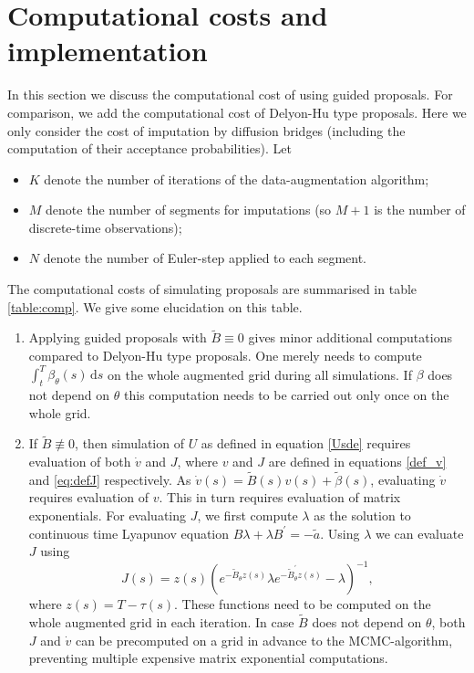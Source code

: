 \documentclass[preprint]{imsart}
\renewcommand{\th}{\theta}
\newcommand{\la}{\lambda}
\renewcommand{\tilde}{\widetilde}
\theoremstyle{definition}
\newcommand{\dd}{{\,\mathrm d}}
\newcommand{\T}{{\prime}}
\begin{document}
\section{Computational costs and implementation}\label{sec:impl}

In this section we discuss the computational cost of using guided proposals. For comparison, we add the computational cost of Delyon-Hu type proposals. Here we only consider the cost of imputation by diffusion bridges (including the computation of their acceptance probabilities). 
 Let
\begin{itemize}
\item $K$ denote the number of iterations of the data-augmentation algorithm;
\item $M$ denote the number of segments for imputations (so $M+1$ is the number of discrete-time observations);
\item $N$ denote the number of Euler-step applied to each segment.
\end{itemize}
The computational costs of simulating proposals are summarised in table \ref{table:comp}. We give some elucidation on this table. 
\begin{enumerate}

\item Applying guided proposals with $\tilde{B}\equiv 0$ gives minor additional computations compared to Delyon-Hu type proposals. One merely needs to compute $\int_t^T \beta_\th(s) \dd s$ on the whole augmented grid during all simulations. If $\beta$ does not depend on $\th$ this computation  needs to be carried out only once on the whole grid. 

\item If $\tilde{B}\not\equiv 0$, then simulation of  $U$ as defined in equation \eqref{Usde} requires evaluation of both $\dot{v}$ and $J$, where $v$ and $J$ are defined in equations \eqref{def_v} and \eqref{eq:defJ} respectively.  As $\dot{v}(s)=\tilde{B}(s) v(s) +\tilde\beta(s)$, evaluating $\dot{v}$ requires evaluation of $v$. This in turn requires evaluation of matrix exponentials. For evaluating $J$, we first compute  $\lambda$ as the solution to continuous time Lyapunov equation $B \lambda + \lambda  B^\T = -\tilde{a}$.  Using $\la$ we can evaluate $J$ using \[
J(s)  = z(s) \left(e^{- \tilde{B}_\th z(s)} \lambda e^{-\tilde{B}_\th^\T z(s)} -\lambda  \right)^{-1},
\]
where $z(s)=T-\tau(s)$. These functions  need to be computed  on the whole augmented  grid  in each iteration. In case $\tilde{B}$ does not depend on $\th$, both $J$ and $\dot{v}$ can be precomputed on a grid in advance to the MCMC-algorithm, preventing multiple expensive matrix exponential computations. 

\end{enumerate}
\end{document}
